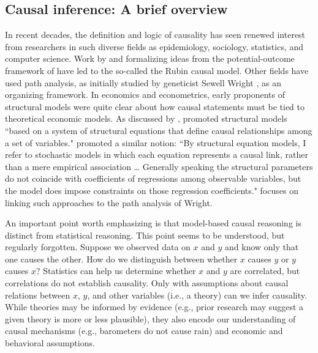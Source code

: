 \documentclass[11pt,reqno,titlepage]{amsart}
\begin{document}
\begin{doublespace}
\subsection{Causal inference: A brief overview}
In recent decades, the definition and logic of causality has seen renewed interest from researchers in such diverse fields as epidemiology, sociology, statistics, and computer science. 
Work by \citet{Rubin:1974im,Rubin:1977dv} and \citet{Holland:1986p7458} formalizing ideas from the potential-outcome framework of \citet{Neyman:1923aa} have led to the so-called the Rubin causal model. 
Other fields have used path analysis, as initially studied by geneticist Sewell Wright \citep{Wright:1921aa}, as an organizing framework.
In economics and econometrics, early proponents of structural models were quite clear about how causal statements must be tied to theoretical economic models.
As discussed by \citet{Heckman:2015ez}, \citet{Haavelmo:1943cl,Haavelmo:1944jq} promoted structural models ``based on a system of structural equations that define causal relationships among a set of variables."
\citet[p.\,979]{Goldberger:1972cq} promoted a similar notion: ``By structural equation models, I refer to stochastic models in which each equation represents a causal link, rather than a mere empirical association \dots
Generally speaking the structural parameters do not coincide with coefficients of regressions among observable variables, but the model does impose constraints on those regression coefficients."
\citet{Goldberger:1972cq} focuses on linking such approaches to the path analysis of Wright.

An important point worth emphasizing is that model-based causal reasoning is distinct from statistical reasoning. 
This point seems to be understood, but regularly forgotten.
Suppose we observed data on $x$ and $y$ and know only that one causes the other. How do we distinguish between whether $x$ causes $y$ or $y$ causes $x$? 
Statistics can help us determine whether $x$ and $y$ are correlated, but correlations do not establish causality.
Only with assumptions about causal relations between $x$, $y$, and other variables (i.e., a theory) can we infer causality.
While theories may be informed by evidence (e.g., prior research may suggest a given theory is more or less plausible), they also encode our understanding of causal mechanisms (e.g., barometers do not cause rain) and economic and behavioral assumptions.


\end{doublespace}
\end{document}
